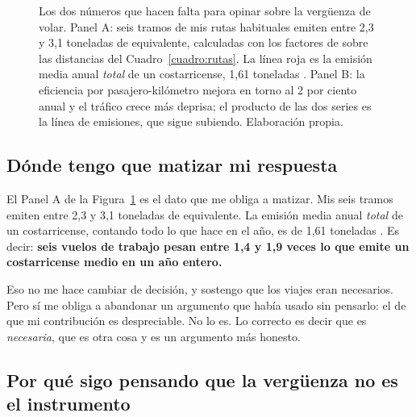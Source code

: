 \documentclass[11pt,letterpaper]{article}
\newcommand{\eAx}[1]{(#1-2009)*0.385}
\newcommand{\eAy}[1]{#1*0.0160}
\begin{document}
\begin{figure}[t]
\caption{Los dos números que hacen falta para opinar sobre la vergüenza de
volar. Panel A: seis tramos de mis rutas habituales emiten entre 2,3 y 3,1
toneladas de  equivalente, calculadas con los factores de
\textcite{defra2025} sobre las distancias del Cuadro~\ref{cuadro:rutas}. La
línea roja es la emisión media anual \emph{total} de un costarricense, 1,61
toneladas \parencite{owid2026costarica}. Panel B: la eficiencia por
pasajero-kilómetro mejora en torno al 2 por ciento anual
\parencite{iata2026eficiencia} y el tráfico crece más deprisa; el producto de
las dos series es la línea de emisiones, que sigue subiendo. Elaboración
propia.}
\label{fig:huella}
\end{figure}

\subsection*{Dónde tengo que matizar mi respuesta}

El Panel A de la Figura~\ref{fig:huella} es el dato que me obliga a matizar.
Mis seis tramos emiten entre 2,3 y 3,1 toneladas de  equivalente. La
emisión media anual \emph{total} de un costarricense, contando todo lo que
hace en el año, es de 1,61 toneladas \parencite{owid2026costarica}. Es decir:
\textbf{seis vuelos de trabajo pesan entre 1,4 y 1,9 veces lo que emite un
costarricense medio en un año entero.}

Eso no me hace cambiar de decisión, y sostengo que los viajes eran necesarios.
Pero sí me obliga a abandonar un argumento que había usado sin pensarlo: el de
que mi contribución es despreciable. No lo es. Lo correcto es decir que es
\emph{necesaria}, que es otra cosa y es un argumento más honesto.

\subsection*{Por qué sigo pensando que la vergüenza no es el instrumento}
\end{document}
